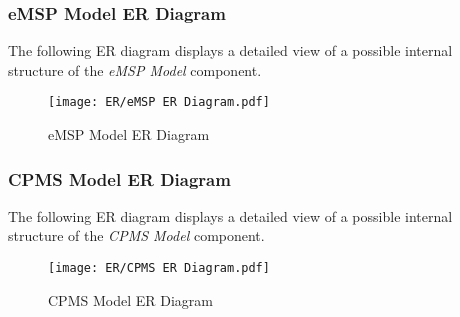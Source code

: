 \subsubsection{eMSP Model ER Diagram}
The following ER diagram displays a detailed view of a possible internal structure of the \textit{eMSP Model} component.
\begin{figure}[H]
    \begin{center}
    \texttt{[image: ER/eMSP ER Diagram.pdf]}
    \caption{eMSP Model ER Diagram}
    \label{fig:eMSPERDiagram}
    \end{center}
\end{figure}
\newpage
\subsubsection{CPMS Model ER Diagram}
The following ER diagram displays a detailed view of a possible internal structure of the \textit{CPMS Model} component.
\begin{figure}[H]
    \begin{center}
    \texttt{[image: ER/CPMS ER Diagram.pdf]}
    \caption{CPMS Model ER Diagram}
    \label{fig:CPMSERDiagram}
    \end{center}
\end{figure}
\newpage
